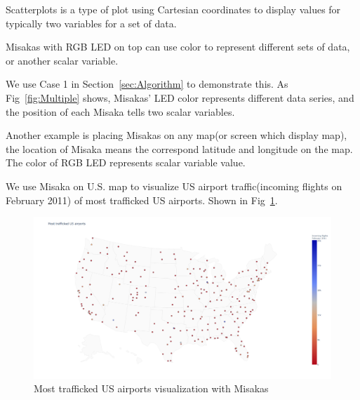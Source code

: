 \documentclass[conference]{IEEEtran}
\begin{document}
Scatterplots is a type of plot using Cartesian coordinates to display values for typically two variables for a set of data. 




Misakas with RGB LED on top can use color to represent different sets of data, or another scalar variable.

We use Case 1 in Section~\ref{sec:Algorithm} to demonstrate this. As Fig~\ref{fig:Multiple} shows, Misakas’ LED color represents different data series, and the position of each Misaka tells two scalar variables. 

Another example is placing Misakas on any map(or screen which display map), the location of Misaka means the correspond latitude and longitude on the map. The color of RGB LED represents scalar variable value.

We use Misaka on U.S. map to visualize US airport traffic(incoming flights on February 2011) of most trafficked US airports. Shown in Fig~\ref{fig:scatterplots2}.

\begin{figure}[htbp]
    \centering
    \includegraphics[width=\columnwidth]{scatterplots2.png}
    \caption{Most trafficked US airports visualization with Misakas}
    \label{fig:scatterplots2}
\end{figure}



\end{document}
